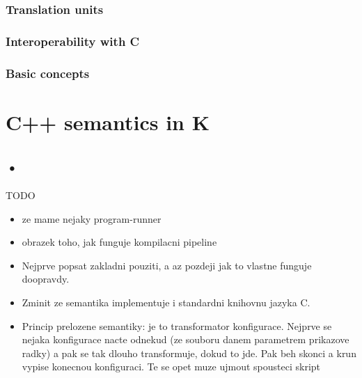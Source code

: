 \documentclass{fithesis3}
\begin{document}
\subsection{Translation units}

\subsection{Interoperability with C}

\subsection{Basic concepts}


\chapter{C++ semantics in K}




\section{•}

TODO
\begin{itemize}
\item ze mame nejaky program-runner
\item obrazek toho, jak funguje kompilacni pipeline
\item Nejprve popsat zakladni pouziti, a az pozdeji jak to vlastne funguje doopravdy.
\item Zminit ze semantika implementuje i standardni knihovnu jazyka C.
\item Princip prelozene semantiky: je to transformator konfigurace. Nejprve se nejaka konfigurace nacte odnekud (ze souboru danem parametrem prikazove radky) a pak se tak dlouho transformuje, dokud to jde. Pak beh skonci a krun vypise konecnou konfiguraci. Te se opet muze ujmout spousteci skript 
\end{itemize}
\end{document}
